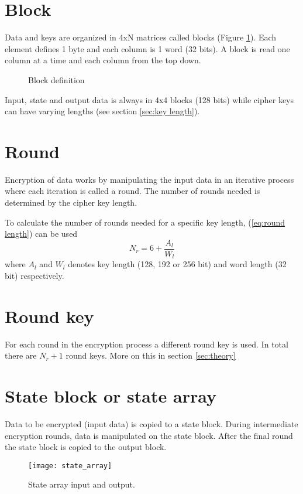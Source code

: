 \documentclass[report.tex]{subfiles}
\begin{document}
\section{Block}
Data and keys are organized in 4xN matrices called blocks (Figure \ref{fig:block definition}). Each element defines 1 byte and each column is 1 word (32 bits). A block is read one column at a time and each column from the top down.

\begin{figure}[h]
\centering
	\caption{Block definition}
	\label{fig:block definition}
\end{figure}

Input, state and output data is always in 4x4 blocks (128 bits) while cipher keys can have varying lengths (see section \ref{sec:key length}).

\section{Round}
Encryption of data works by manipulating the input data in an iterative process where each iteration is called a round. The number of rounds needed is determined by the cipher key length.

To calculate the number of rounds needed for a specific key length, (\ref{eq:round length}) can be used
\begin{equation}\label{eq:round length}
	N_r = 6 + \frac{A_{l}}{W_{l}}
\end{equation}
where $A_l$ and $W_l$ denotes key length (128, 192 or 256 bit) and word length (32 bit) respectively.

\section{Round key}
For each round in the encryption process a different round key is used. In total there are $N_r+1$ round keys. More on this in section \ref{sec:theory}

\section{State block or state array}
Data to be encrypted (input data) is copied to a state block. During intermediate encryption rounds, data is manipulated on the state block. After the final round the state block is copied to the output block.%

\begin{figure}[h]
\centering
\texttt{[image: state\_array]}
\caption{State array input and output.\cite{fips}}
\label{fig:state array}
\end{figure}
\end{document}
